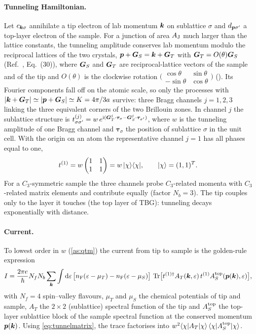 \paragraph{Tunneling Hamiltonian.} Let $c_{\bm k\sigma}$ annihilate a tip electron of lab momentum $\bm k$ on sublattice
$\sigma$ and $d_{\bm p\sigma'}$ a top-layer electron of the sample. For a junction of area $A_{\rm J}$ much larger than
the lattice constants, the tunneling amplitude conserves lab momentum modulo the reciprocal lattices of the two
crystals, $\bm p+\bm G_S=\bm k+\bm G_T$ with $\bm G_T=O(\theta)\bm G_S$ (Ref.~\cite{Wei2025}, Eq.~(30)), where $\bm G_S$ and $\bm G_T$ are reciprocal-lattice vectors of the sample and of the tip and $O(\theta)$ is the
clockwise rotation $\bigl(\begin{smallmatrix}\cos\theta&\sin\theta\\-\sin\theta&\cos\theta\end{smallmatrix}\bigr)$
(). Its Fourier components fall off on the atomic scale, so only the processes with
$|\bm k+\bm G_T|\simeq|\bm p+\bm G_S|\simeq K=4\pi/3a$ survive: three Bragg channels $j=1,2,3$ linking the three
equivalent corners of the two Brillouin zones. In channel $j$ the sublattice structure is
$t^{(j)}_{\sigma\sigma'}=w\,e^{\mathrm i(\bm G^j_T\cdot\bm\tau_\sigma-\bm G^j_S\cdot\bm\tau_{\sigma'})}$, where $w$ is the tunneling amplitude of one
Bragg channel and $\bm\tau_\sigma$ the position of sublattice $\sigma$ in the unit cell. With the origin on
an atom the representative channel $j=1$ has all phases equal to one,
\begin{equation}
t^{(1)}=w\begin{pmatrix}1&1\\1&1\end{pmatrix}=w\,|\chi\rangle\langle \chi|,\qquad |\chi\rangle=(1,1)^T .
\label{eq:tunnelmatrix}
\end{equation}
For a $C_3$-symmetric sample the three channels probe $C_3$-related momenta with $C_3$-related matrix elements and
contribute equally (factor $N_b=3$). The tip couples only to the layer it touches (the top layer of TBG):
tunneling decays exponentially with distance.

\paragraph{Current.} To lowest order in $w$ (\cref{as:qtm}) the current from tip to sample is the golden-rule
expression
\begin{equation}
I=\frac{2\pi e}{\hbar}N_fN_b\sum_{\bm k}\int\mathrm d\varepsilon\,
\bigl[n_{\rm F}(\varepsilon-\mu_T)-n_{\rm F}(\varepsilon-\mu_S)\bigr]\,
\operatorname{Tr}\bigl[t^{(1)\dagger}A_T(\bm k,\varepsilon)\,t^{(1)}A^{\rm top}_S(\bm p(\bm k),\varepsilon)\bigr],
\label{eq:current}
\end{equation}
with $N_f=4$ spin--valley flavours, $\mu_T$ and $\mu_S$ the chemical potentials of tip and sample, $A_T$ the $2\times2$ (sublattice) spectral function of the tip and
$A_S^{\rm top}$ the top-layer sublattice block of the sample spectral function at the conserved momentum
$\bm p(\bm k)$. Using \cref{eq:tunnelmatrix}, the trace factorises into $w^2\langle \chi| A_T|\chi\rangle\,\langle \chi| A^{\rm top}_S|\chi\rangle$.

